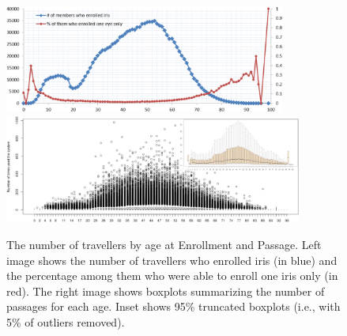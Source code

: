 \documentclass{cta-author}%
\begin{document}
\begin{figure}[!t]
\includegraphics[width=0.45\linewidth,height=1.4in]{eps/age-one-eye.eps}\quad 
\includegraphics[width=0.55\linewidth,height=1.4in]{eps/USED-wInset-0.eps} 

\caption{
The number of travellers by age at Enrollment and Passage. 
Left image shows the number of travellers who enrolled iris (in blue) and the percentage among them who were able to enroll one iris  only (in red). 
The right image shows  boxplots summarizing the number of passages for each age. Inset shows 95\% truncated boxplots (i.e., with 5\% of outliers removed). 
}
\label{fBoxplot-IQen}
\end{figure}
\end{document}
